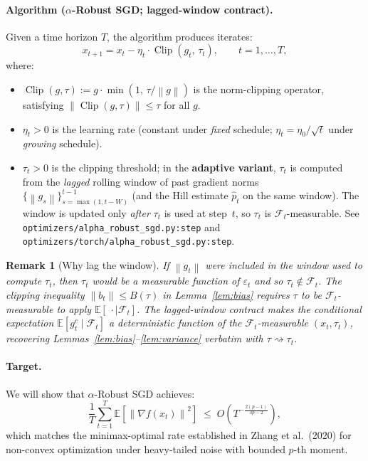 \documentclass[11pt]{article}
\newtheorem{remark}[theorem]{Remark}
\theoremstyle{definition}
\newcommand{\E}{\mathbb{E}}
\newcommand{\norm}[1]{\left\| #1 \right\|}
\newcommand{\clip}{\operatorname{Clip}}
\newcommand{\phat}{\hat{p}}
\newcommand{\Filt}{\mathcal{F}}
\begin{document}
\paragraph{Algorithm ($\alpha$-Robust SGD; lagged-window contract).}
Given a time horizon $T$, the algorithm produces iterates:
\[
  x_{t+1} = x_t - \eta_t \cdot \clip(g_t,\, \tau_t), \qquad t = 1, \ldots, T,
\]
where:
\begin{itemize}[noitemsep]
  \item $\clip(g, \tau) := g \cdot \min(1,\, \tau/\norm{g})$ is the norm-clipping
    operator, satisfying $\norm{\clip(g, \tau)} \leq \tau$ for all $g$.
  \item $\eta_t > 0$ is the learning rate (constant under \emph{fixed} schedule;
    $\eta_t = \eta_0/\sqrt{t}$ under \emph{growing} schedule).
  \item $\tau_t > 0$ is the clipping threshold; in the \textbf{adaptive variant},
    $\tau_t$ is computed from the \emph{lagged} rolling window of past gradient
    norms $\{\norm{g_s}\}_{s = \max(1, t-W)}^{t-1}$ (and the Hill estimate
    $\phat_t$ on the same window). The window is updated only \emph{after}
    $\tau_t$ is used at step~$t$, so $\tau_t$ is $\Filt_t$-measurable. See
    \texttt{optimizers/alpha\_robust\_sgd.py:step} and
    \texttt{optimizers/torch/alpha\_robust\_sgd.py:step}.
\end{itemize}

\begin{remark}[Why lag the window]\label{rem:lag}
If $\norm{g_t}$ were included in the window used to compute $\tau_t$, then
$\tau_t$ would be a measurable function of $\varepsilon_t$ and so $\tau_t \notin
\Filt_t$. The clipping inequality $\norm{b_t}\leq B(\tau)$ in
Lemma~\ref{lem:bias} requires $\tau$ to be $\Filt_t$-measurable to apply
$\E[\,\cdot\mid\Filt_t]$. The lagged-window contract makes the conditional
expectation $\E[g_t^c \mid \Filt_t]$ a deterministic function of the
$\Filt_t$-measurable $(x_t,\tau_t)$, recovering Lemmas~\ref{lem:bias}--\ref{lem:variance}
verbatim with $\tau \rightsquigarrow \tau_t$.
\end{remark}

\paragraph{Target.} We will show that $\alpha$-Robust SGD achieves:
\[
  \frac{1}{T}\sum_{t=1}^{T}\E\!\left[\norm{\nabla f(x_t)}^2\right]
  \;\leq\;
  O\!\left(T^{-\frac{2(p-1)}{3p-2}}\right),
\]
which matches the minimax-optimal rate established in Zhang et al.~(2020)
for non-convex optimization under heavy-tailed noise with bounded $p$-th moment.
\end{document}
